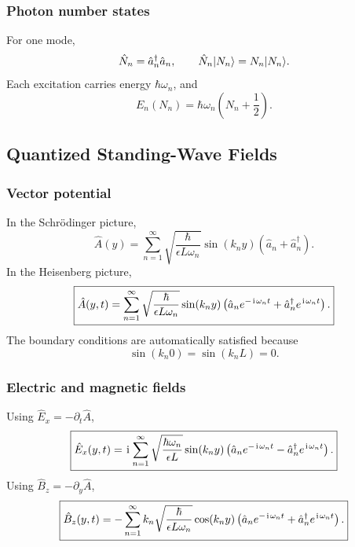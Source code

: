 \subsubsection{Photon number states}
For one mode,
\begin{equation}
 \hat N_n=\hat a_n^\dagger\hat a_n,
 \qquad
 \hat N_n|{N_n}\rangle=N_n|{N_n}\rangle.
\end{equation}
Each excitation carries energy $\hbar\omega_n$, and
\begin{equation}
 E_n(N_n)=\hbar\omega_n\left(N_n+\frac12\right).
\end{equation}

\subsection{Quantized Standing-Wave Fields}

\subsubsection{Vector potential}
In the Schr\"odinger picture,
\begin{equation}
 \boxed{
 \hat A(y)=\sum_{n=1}^{\infty}
 \sqrt{\frac{\hbar}{\epsilon L\omega_n}}
 \sin(k_ny)(\hat a_n+\hat a_n^\dagger).}
\end{equation}
In the Heisenberg picture,
\begin{equation}
 \boxed{
 \hat A(y,t)=\sum_{n=1}^{\infty}
 \sqrt{\frac{\hbar}{\epsilon L\omega_n}}
 \sin(k_ny)
 \left(\hat a_ne^{-\hspace{1pt}\mathrm{i}\hspace{1pt}\omega_nt}
 +\hat a_n^\dagger e^{\hspace{1pt}\mathrm{i}\hspace{1pt}\omega_nt}\right).}
\end{equation}
The boundary conditions are automatically satisfied because
\begin{equation}
 \sin(k_n0)=\sin(k_nL)=0.
\end{equation}

\subsubsection{Electric and magnetic fields}
Using $\hat E_x=-\partial_t\hat A$,
\begin{equation}\label{electric field}
 \boxed{
 \hat E_x(y,t)=\hspace{1pt}\mathrm{i}\hspace{1pt}\sum_{n=1}^{\infty}
 \sqrt{\frac{\hbar\omega_n}{\epsilon L}}
 \sin(k_ny)
 \left(\hat a_ne^{-\hspace{1pt}\mathrm{i}\hspace{1pt}\omega_nt}
 -\hat a_n^\dagger e^{\hspace{1pt}\mathrm{i}\hspace{1pt}\omega_nt}\right).}
\end{equation}
Using $\hat B_z=-\partial_y\hat A$,
\begin{equation}
 \boxed{
 \hat B_z(y,t)=-\sum_{n=1}^{\infty}
 k_n\sqrt{\frac{\hbar}{\epsilon L\omega_n}}
 \cos(k_ny)
 \left(\hat a_ne^{-\hspace{1pt}\mathrm{i}\hspace{1pt}\omega_nt}
 +\hat a_n^\dagger e^{\hspace{1pt}\mathrm{i}\hspace{1pt}\omega_nt}\right).}
\end{equation}

